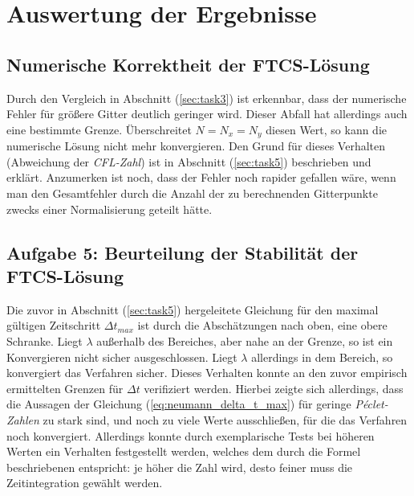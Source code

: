 \documentclass[12pt,a4paper,titlepage,headinclude,bibtotoc]{scrartcl}
\begin{document}
\hfill%

\section{Auswertung der Ergebnisse}
\label{sec:interpretation}
\subsection{Numerische Korrektheit der FTCS-Lösung}
\label{sec:disc_num_corr}
Durch den Vergleich in Abschnitt (\ref{sec:task3}) ist erkennbar, dass der numerische Fehler für größere Gitter deutlich geringer wird. Dieser Abfall hat allerdings auch eine bestimmte Grenze. Überschreitet $N = N_x = N_y$ diesen Wert, so kann die numerische Lösung nicht mehr konvergieren. Den Grund für dieses Verhalten (Abweichung der \textit{CFL-Zahl}) ist in Abschnitt (\ref{sec:task5}) beschrieben und erklärt. Anzumerken ist noch, dass der Fehler noch rapider gefallen wäre, wenn man den Gesamtfehler durch die Anzahl der zu berechnenden Gitterpunkte zwecks einer Normalisierung geteilt hätte.

\subsection{Aufgabe 5: Beurteilung der Stabilität der FTCS-Lösung}
\label{sec:disc_stability}
Die zuvor in Abschnitt (\ref{sec:task5}) hergeleitete Gleichung für den maximal gültigen Zeitschritt $\Delta t_{max}$ ist durch die Abschätzungen nach oben, eine obere Schranke. Liegt $\lambda$ außerhalb des Bereiches, aber nahe an der Grenze, so ist ein Konvergieren nicht sicher ausgeschlossen. Liegt $\lambda$ allerdings in dem Bereich, so konvergiert das Verfahren sicher. Dieses Verhalten konnte an den zuvor empirisch ermittelten Grenzen für $\Delta t$ verifiziert werden. Hierbei zeigte sich allerdings, dass die Aussagen der Gleichung (\ref{eq:neumann_delta_t_max}) für geringe \textit{Péclet-Zahlen} zu stark sind, und noch zu viele Werte ausschließen, für die das Verfahren noch konvergiert. Allerdings konnte durch exemplarische Tests bei höheren Werten ein Verhalten festgestellt werden, welches dem durch die Formel beschriebenen entspricht: je höher die Zahl wird, desto feiner muss die Zeitintegration gewählt werden.
\end{document}
